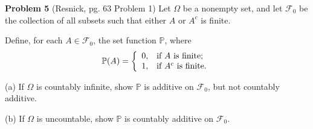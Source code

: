 \documentclass{article}
\begin{document}
 \setcounter{page}{7}
\vspace{3 mm}



\noindent \textbf{Problem 5} (Resnick, pg. 63 Problem 1) Let $\Omega$ be a nonempty set, and let $\mathcal{F}_{0}$ be the collection of all subsets such that either $A$ or $A^{c}$ is finite.

\vspace{2 mm}

\noindent Define, for each $A \in \mathcal{F}_{0}$, the set function $\mathbb{P}$, where
\begin{eqnarray*} \mathbb{P}(A) = \left\{
                                    \begin{array}{ll}
                                      0, & \hbox{if $A$ is finite;} \\
                                      1, & \hbox{if $A^{c}$ is finite.}
                                    \end{array}
                                  \right. \end{eqnarray*}

\vspace{2 mm}

\noindent (a) If $\Omega$ is countably infinite, show $\mathbb{P}$ is additive on $\mathcal{F}_{0}$, but not countably additive.

\vspace{2 mm}

\noindent (b) If $\Omega$ is uncountable, show $\mathbb{P}$ is countably additive on $\mathcal{F}_{0}$.
\end{document}
